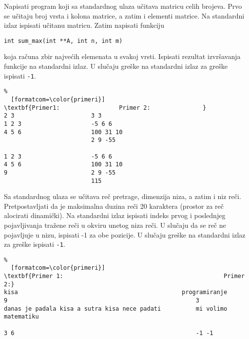 \documentclass{article}
\begin{document}
\begin{z}
Napisati program koji sa standardnog ulaza učitava matricu celih brojeva. Prvo se učitaju broj
vrsta i kolona matrice, a zatim i elementi matrice. Na standardni izlaz ispisati učitanu matricu.
Zatim napisati funkciju \\
\begin{center}{\tt int sum\_max(int **A, int n, int m)} \end{center}
koja računa zbir najvećih elemenata u svakoj vrsti. Ispisati rezultat izvršavanja funkcije na standardni izlaz.
 U slučaju greške na standardni izlaz za greške ispisati {\tt -1}.
\end{z}

\begin{Verbatim}%
  [formatcom=\color{primeri}]
\textbf{Primer1:                 Primer 2:               }
2 3                      3 3
1 2 3                    -5 6 6
4 5 6                    100 31 10
                         2 9 -55

1 2 3                    -5 6 6
4 5 6                    100 31 10
9                        2 9 -55
                         115
\end{Verbatim}

\begin{z}
Sa standardnog ulaza se učitava reč pretrage, dimenzija niza, a zatim i niz reči. 
Pretpostavljati da je maksimalna duzina reči 20 karaktera (prostor za reč alocirati dinamički).
Na standardni izlaz ispisati indeks prvog i poslednjeg pojavljivanja tražene reči u okviru unetog niza reči. U slučaju da 
se reč ne pojavljuje u nizu, ispisati -1 za obe pozicije. 
U slučaju greške na standardni izlaz za greške ispisati {\tt -1}.
\end{z}


\begin{Verbatim}%
  [formatcom=\color{primeri}] 
\textbf{Primer 1:                                              Primer 2:}
kisa	                                           programiranje
9                                                      3
danas je padala kisa a sutra kisa nece padati          mi volimo matematiku

3 6                                                    -1 -1 
\end{Verbatim}
\end{document}
